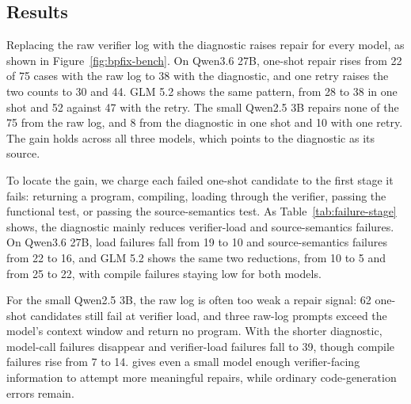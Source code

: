 \subsection{Results}
\label{sec:benchmark-results}

Replacing the raw verifier log with the \sys diagnostic raises repair for every model, as shown in Figure~\ref{fig:bpfix-bench}.
On Qwen3.6 27B, one-shot repair rises from 22 of 75 cases with the raw log to 38 with the diagnostic, and one retry raises the two counts to 30 and 44.
GLM 5.2 shows the same pattern, from 28 to 38 in one shot and 52 against 47 with the retry.
The small Qwen2.5 3B repairs none of the 75 from the raw log, and 8 from the diagnostic in one shot and 10 with one retry.
The gain holds across all three models, which points to the diagnostic as its source.



To locate the gain, we charge each failed one-shot candidate to the first stage it fails: returning a program, compiling, loading through the verifier, passing the functional test, or passing the source-semantics test.
As Table~\ref{tab:failure-stage} shows, the diagnostic mainly reduces verifier-load and source-semantics failures.
On Qwen3.6 27B, load failures fall from 19 to 10 and source-semantics failures from 22 to 16, and GLM 5.2 shows the same two reductions, from 10 to 5 and from 25 to 22, with compile failures staying low for both models.

For the small Qwen2.5 3B, the raw log is often too weak a repair signal: 62 one-shot candidates still fail at verifier load, and three raw-log prompts exceed the model's context window and return no program.
With the shorter \sys diagnostic, model-call failures disappear and verifier-load failures fall to 39, though compile failures rise from 7 to 14.
\sys gives even a small model enough verifier-facing information to attempt more meaningful repairs, while ordinary code-generation errors remain.

